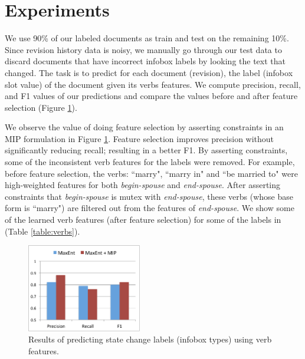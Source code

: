 \section{Experiments}

We use 90\% of our labeled documents as train and test on the remaining 10\%. Since revision history data is noisy, we manually go through our test data to discard documents that have incorrect infobox  labels by looking the  text that  changed. The task is to predict for each document (revision), the label (infobox slot value) of the document given its verbs features. We compute precision, recall, and F1 values of our predictions  and compare the values before and after feature selection (Figure \ref{fig:result}).


We observe the value of doing feature selection by asserting constraints in an MIP formulation in Figure \ref{fig:result}. Feature selection improves precision without significantly reducing  recall; resulting in a better F1. By asserting constraints, some of the  inconsistent verb features for the labels were removed. For example, before feature selection, the verbs: ``marry", ``marry in" and ``be married to" were high-weighted features for both \textit{begin-spouse} and \textit{end-spouse}. After asserting constraints that \textit{begin-spouse} is mutex with \textit{end-spouse}, these verbs (whose base form is ``marry") are filtered out from the features of \textit{end-spouse}. We show some of the learned verb features (after feature selection) for some of the labels in (Table \ref{table:verbs}).

\begin{figure}
\begin{center}
\includegraphics[width=5cm,keepaspectratio=true]{figures/result.pdf}
\caption{\label{fig:result} Results of predicting state change labels (infobox types) using verb features.}
\end{center}
\end{figure}

